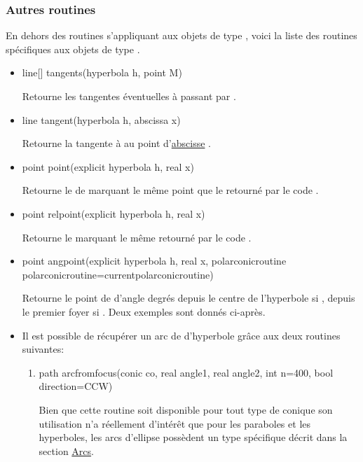 \documentclass[pdftex]{article}
\begin{document}
\subsubsection{Autres routines}
En dehors des routines s'appliquant aux objets de type ,
voici la liste des routines spécifiques aux objets de type
.
\begin{itemize}
\item {}
  \begin{Vcolor}
    line[] tangents(hyperbola h, point M)
  \end{Vcolor}
  Retourne les tangentes éventuelles à  passant
  par .
\item {}
  \begin{Vcolor}
    line tangent(hyperbola h, abscissa x)
  \end{Vcolor}
  Retourne la tangente à  au point
  d'\href{#section.abscissa}{abscisse} .
\item {}
  \begin{Vcolor}
    point point(explicit hyperbola h, real x)
  \end{Vcolor}
  Retourne le  de  marquant le même
  point que le  retourné par le code
  .
\item {}
  \begin{Vcolor}
    point relpoint(explicit hyperbola h, real x)
  \end{Vcolor}
  Retourne le  marquant le même  retourné par
  le code .
\item {}
  \begin{Vcolor}
    point angpoint(explicit hyperbola h, real x,
    polarconicroutine polarconicroutine=currentpolarconicroutine)
  \end{Vcolor}
  Retourne le point de  d'angle  degrés
  depuis le centre de l'hyperbole\linebreak
  si , depuis le premier foyer
  si . Deux exemples sont donnés
  ci-après.
\item Il est possible de récupérer un arc de d'hyperbole
  grâce aux deux routines suivantes:
  \begin{enumerate}
  \item
    \begin{Vcolor}
      path arcfromfocus(conic co, real angle1, real angle2, int n=400, bool direction=CCW)
    \end{Vcolor}
    Bien que cette routine soit disponible pour tout type de conique son
    utilisation n'a réellement d'intérêt que pour les paraboles et les
    hyperboles, les arcs d'ellipse possèdent un type spécifique décrit dans
    la section \href{#section.arc}{Arcs}.


\end{enumerate}
\end{itemize}
\end{document}
